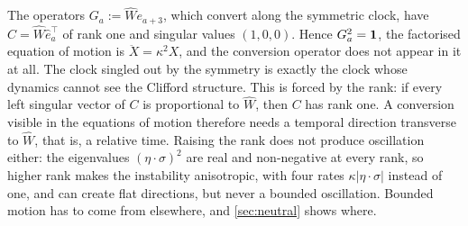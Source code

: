 \begin{example}
\label{ex:blindclock}
The operators $G_a:=\widehat W e_{a+3}$, which convert along the symmetric clock, have $C=\widehat W\hat e_a^{\!\top}$ of rank one and
singular values $(1,0,0)$. Hence $G_a^2=\mathbf 1$, the factorised equation of motion is $\ddot X=\kappa^2X$, and the conversion operator does not
appear in it at all. The clock singled out by the symmetry is exactly the clock whose dynamics cannot see the Clifford structure. This is
forced by the rank: if every left singular vector of $C$ is proportional to $\widehat W$, then $C$ has rank one. A conversion visible in the
equations of motion therefore needs a temporal direction transverse to $\widehat W$, that is, a relative time. Raising the rank does not
produce oscillation either: the eigenvalues $(\eta\cdot\sigma)^2$ are real and non-negative at every rank, so higher rank makes the
instability anisotropic, with four rates $\kappa|\eta\cdot\sigma|$ instead of one, and can create flat directions, but never a bounded
oscillation. Bounded motion has to come from elsewhere, and \cref{sec:neutral} shows where.
\end{example}
